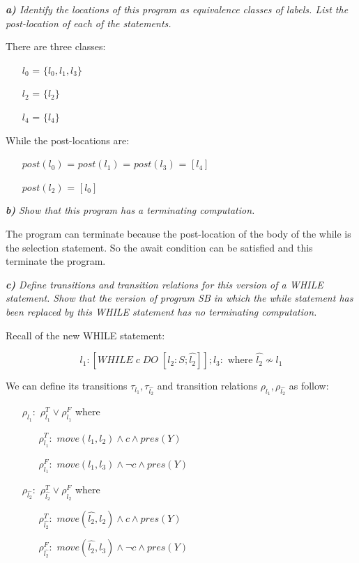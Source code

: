 \documentclass[12pt]{article}
\begin{document}
\textit{\textbf{a)} Identify the locations of this program as equivalence classes of labels. List the post-location of each of the statements.}

There are three classes:
\begin{itemize}
\item[$l_0$] = $\{ l_0,l_1,l_3 \} $
\item[$l_2$] = $\{ l_2 \} $
\item[$l_4$] = $\{ l_4 \} $
\end{itemize}

While the post-locations are:
\begin{itemize}
\item[$post(l_0)$] = $post(l_1)$ = $post(l_3)$ = $[ l_4 ] $
\item[$post(l_2)$] = $[ l_0 ] $
\end{itemize}

\textit{\textbf{b)} Show that this program has a terminating computation.}

The program can terminate because the post-location of the body of the while is the selection statement. So the await condition can be satisfied and this terminate the program.

\medskip
\textit{\textbf{c)} Define transitions and transition relations for this version of a WHILE statement.
Show that the version of program SB in which the while statement has been replaced by this WHILE statement has no terminating computation.}

Recall of the new WHILE statement:

$$ l_1: [WHILE\;c\;DO\;[l_2:S;\hat{l_2}]]; l_3: \textrm{ where } \hat{l_2} \nsim l_1$$

We can define its transitions $\tau_{l_1},\tau_{\hat{l_2}}$ and transition relations $\rho_{l_1},\rho_{\hat{l_2}}$ as follow:

\begin{itemize}
\item[$\rho_{l_1}:$] $\rho^T_{l_1} \lor \rho^F_{l_1}$ where 
	\begin{itemize}
		\item[$\rho^T_{l_1}:$] $move(l_1,l_2) \land c \land pres(Y)$ 
		\item[$\rho^F_{l_1}:$] $move(l_1,l_3) \land \neg c \land pres(Y)$
	\end{itemize}
\item[$\rho_{\hat{l_2}}:$] $\rho^T_{\hat{l_2}} \lor \rho^F_{\hat{l_2}}$ where 
	\begin{itemize}
		\item[$\rho^T_{\hat{l_2}}:$] $move(\hat{l_2},l_2) \land c \land pres(Y)$ 
		\item[$\rho^F_{\hat{l_2}}:$] $move(\hat{l_2},l_3) \land \neg c \land pres(Y)$
	\end{itemize}
\end{itemize}
\end{document}
